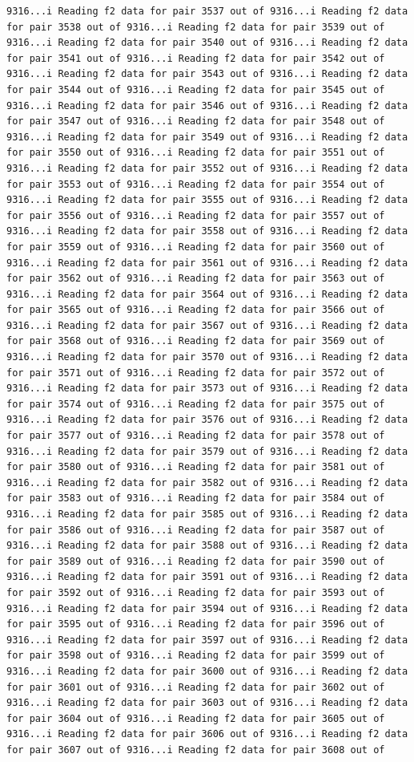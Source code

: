 \documentclass[
]{article}
\begin{document}
\begin{verbatim}
9316...i Reading f2 data for pair 3537 out of 9316...i Reading f2 data for pair 3538 out of 9316...i Reading f2 data for pair 3539 out of 9316...i Reading f2 data for pair 3540 out of 9316...i Reading f2 data for pair 3541 out of 9316...i Reading f2 data for pair 3542 out of 9316...i Reading f2 data for pair 3543 out of 9316...i Reading f2 data for pair 3544 out of 9316...i Reading f2 data for pair 3545 out of 9316...i Reading f2 data for pair 3546 out of 9316...i Reading f2 data for pair 3547 out of 9316...i Reading f2 data for pair 3548 out of 9316...i Reading f2 data for pair 3549 out of 9316...i Reading f2 data for pair 3550 out of 9316...i Reading f2 data for pair 3551 out of 9316...i Reading f2 data for pair 3552 out of 9316...i Reading f2 data for pair 3553 out of 9316...i Reading f2 data for pair 3554 out of 9316...i Reading f2 data for pair 3555 out of 9316...i Reading f2 data for pair 3556 out of 9316...i Reading f2 data for pair 3557 out of 9316...i Reading f2 data for pair 3558 out of 9316...i Reading f2 data for pair 3559 out of 9316...i Reading f2 data for pair 3560 out of 9316...i Reading f2 data for pair 3561 out of 9316...i Reading f2 data for pair 3562 out of 9316...i Reading f2 data for pair 3563 out of 9316...i Reading f2 data for pair 3564 out of 9316...i Reading f2 data for pair 3565 out of 9316...i Reading f2 data for pair 3566 out of 9316...i Reading f2 data for pair 3567 out of 9316...i Reading f2 data for pair 3568 out of 9316...i Reading f2 data for pair 3569 out of 9316...i Reading f2 data for pair 3570 out of 9316...i Reading f2 data for pair 3571 out of 9316...i Reading f2 data for pair 3572 out of 9316...i Reading f2 data for pair 3573 out of 9316...i Reading f2 data for pair 3574 out of 9316...i Reading f2 data for pair 3575 out of 9316...i Reading f2 data for pair 3576 out of 9316...i Reading f2 data for pair 3577 out of 9316...i Reading f2 data for pair 3578 out of 9316...i Reading f2 data for pair 3579 out of 9316...i Reading f2 data for pair 3580 out of 9316...i Reading f2 data for pair 3581 out of 9316...i Reading f2 data for pair 3582 out of 9316...i Reading f2 data for pair 3583 out of 9316...i Reading f2 data for pair 3584 out of 9316...i Reading f2 data for pair 3585 out of 9316...i Reading f2 data for pair 3586 out of 9316...i Reading f2 data for pair 3587 out of 9316...i Reading f2 data for pair 3588 out of 9316...i Reading f2 data for pair 3589 out of 9316...i Reading f2 data for pair 3590 out of 9316...i Reading f2 data for pair 3591 out of 9316...i Reading f2 data for pair 3592 out of 9316...i Reading f2 data for pair 3593 out of 9316...i Reading f2 data for pair 3594 out of 9316...i Reading f2 data for pair 3595 out of 9316...i Reading f2 data for pair 3596 out of 9316...i Reading f2 data for pair 3597 out of 9316...i Reading f2 data for pair 3598 out of 9316...i Reading f2 data for pair 3599 out of 9316...i Reading f2 data for pair 3600 out of 9316...i Reading f2 data for pair 3601 out of 9316...i Reading f2 data for pair 3602 out of 9316...i Reading f2 data for pair 3603 out of 9316...i Reading f2 data for pair 3604 out of 9316...i Reading f2 data for pair 3605 out of 9316...i Reading f2 data for pair 3606 out of 9316...i Reading f2 data for pair 3607 out of 9316...i Reading f2 data for pair 3608 out of 
\end{verbatim}
\end{document}
